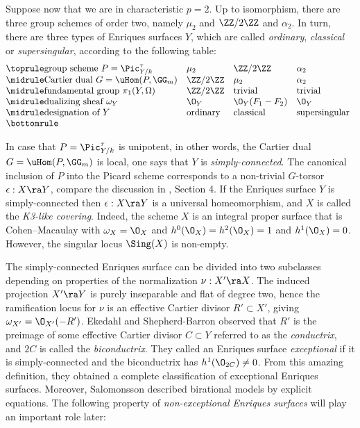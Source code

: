 Suppose now that we are in characteristic $p=2$. Up to isomorphism, there are three group schemes of order two,
namely $\mu_2$ and $\ZZ/2\ZZ$ and $\alpha_2$. In turn, there are three types of Enriques surfaces $Y$, which are called
\emph{ordinary}, \emph{classical} or \emph{supersingular}, according to the following table:
$$
\begin{array}[c]{@{}lll l}
\toprule
\text{\rm group scheme $P=\Pic^\tau_{Y/k}$}		& \mu_2					& \ZZ/2\ZZ					& \alpha_2\\
\midrule
\text{\rm Cartier dual $G=\uHom(P,\GG_m)$}		& \ZZ/2\ZZ				& \mu_2						& \alpha_2\\
\midrule
\text{\rm fundamental group $\pi_1(Y,\Omega)$}	& \ZZ/2\ZZ				& {\rm trivial}				& {\rm trivial}	\\
\midrule
\text{\rm dualizing sheaf $\omega_Y$}			& \O_Y					& \O_Y(F_1-F_2) 			& \O_Y\\
\midrule
\text{designation of $Y$}						& \text{\rm ordinary}	& \text{\rm classical} 	& \text{\rm supersingular}\\
\bottomrule
\end{array}
$$

In case that $P=\Pic^\tau_{Y/k}$ is unipotent, in other words, the Cartier dual $G=\uHom(P,\GG_m)$ is local,
one says that $Y$ is \emph{simply-connected}.
The canonical inclusion of $P$ into the Picard scheme corresponds to a non-trivial $G$-torsor $\epsilon:X\ra Y$,
compare the discussion in \cite{Schroeer-2021a}, Section 4.
If the Enriques surface $Y$ is simply-connected  then $\epsilon:X\ra Y$ is a universal homeomorphism, and  $X$ is called
the \emph{K3-like covering}. Indeed, the scheme $X$ is an integral proper surface that is Cohen--Macaulay
with $\omega_X=\O_X$ and $h^0(\O_X)=h^2(\O_X)=1$ and $h^1(\O_X)=0$.
However, the singular locus $\Sing(X)$ is non-empty.

The simply-connected Enriques surface can be divided into two   subclasses depending on
properties of the normalization $\nu:X'\ra X$. The induced projection $X'\ra Y$ is purely inseparable and flat of degree two,
hence the ramification locus for $\nu$ is an effective Cartier divisor $R'\subset X'$, giving $\omega_{X'}=\O_{X'}(-R')$.
Ekedahl and Shepherd-Barron \cite{Ekedahl-Shepherd-Barron-2004}
observed that $R'$ is the preimage of some effective Cartier divisor $C\subset Y$
referred to as the  \emph{conductrix}, and  $2C$ is called the \emph{biconductrix}.
They  called an Enriques surface \emph{exceptional} if it is simply-connected and
the biconductrix has $h^1(\O_{2C})\neq 0$. From this amazing definition, they obtained a complete classification
of exceptional Enriques surfaces. Moreover, Salomonsson \cite{Salomonsson-2003} described birational models by explicit equations.
The following property of  \emph{non-exceptional Enriques surfaces} will play an important role later:

